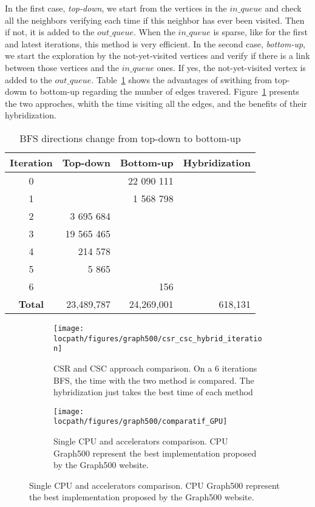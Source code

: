 In the first case, \textit{top-down}, we start from the vertices in the $in\_queue$ and check all the neighbors verifying each time if this neighbor has ever been visited. 
Then if not, it is added to the $out\_queue$. 
When the $in\_queue$ is sparse, like for the first and latest iterations, this method is very efficient. 
In the second case, \textit{bottom-up}, we start the exploration by the not-yet-visited vertices and verify if there is a link between those vertices and the $in\_queue$ ones. 
If yes, the not-yet-visited vertex is added to the $out\_queue$. 
Table~\ref{table:direction_optimized} shows the advantages of swithing from top-dowm to bottom-up regarding the number of edges travered.
Figure~\ref{fig:csr_csc} presents the two approches, whith the time visiting all the edges, and the benefits of their hybridization.

\begin{table}[t!]
\centering
\begin{tabular}{c||r|r|r}
		\textbf{Iteration} & \textbf{Top-down} & \textbf{Bottom-up} & \textbf{Hybridization} \\ 
		\hline 
		\hline 
		0 & \color{red}{27} & 22 090 111 & \color{red}{27} \\ 
		1 & \color{red}{8 156} & 1 568 798 & \color{red}{8 156} \\ 
		\hline 
		2 & 3 695 684 & \color{blue}{587 893} & \color{blue}{587 893} \\ 
		3 & 19 565 465 & \color{blue}{12 586} & \color{blue}{12 586} \\ 
		4 & 214 578 & \color{blue}{8 256} & \color{blue}{8 256} \\ 
		5 & 5 865 & \color{blue}{1 201} & \color{blue}{1 201} \\ 
		\hline 
		6 & \color{red}{12} & 156 & \color{red}{12} \\ 
		\hline
		\textbf{Total} & 23,489,787 & 24,269,001 & 618,131 
\end{tabular} 
\caption{BFS directions change from top-down to bottom-up}	
\label{table:direction_optimized}
\end{table}

\begin{figure}[!t]
\begin{subfigure}[t]{.48\textwidth}
	\centering
	\texttt{[image: \\locpath/figures/graph500/csr\_csc\_hybrid\_iteration]}
	\caption{CSR and CSC approach comparison. On a 6 iterations BFS, the time with the two method is compared. The hybridization just takes the best time of each method}
	\label{fig:csr_csc}
\end{subfigure}
\hfill
\begin{subfigure}[t]{.48\textwidth}
	\centering
	\texttt{[image: \\locpath/figures/graph500/comparatif\_GPU]}
	\caption[]{Single CPU and accelerators comparison. CPU Graph500 represent the best implementation proposed by the Graph500 website. }
	\label{fig:single_cpu_accelerators}
\end{subfigure}
\end{figure}

